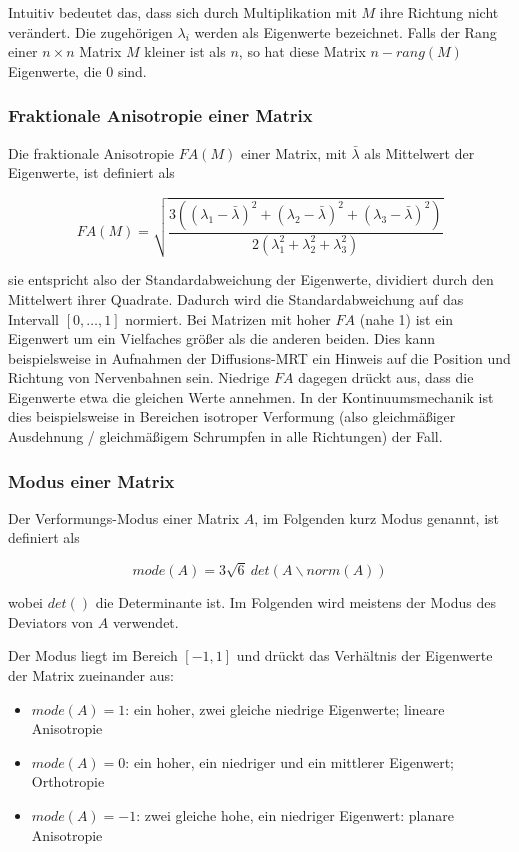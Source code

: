 \documentclass[a4paper,fontsize=12pt,toc=bib,halfparskip]{scrartcl}
\begin{document}
Intuitiv bedeutet das, dass sich durch Multiplikation mit $M$ ihre Richtung nicht ver\"andert. Die zugeh\"origen $\lambda_i$ werden als Eigenwerte bezeichnet.
Falls der Rang einer $n\times n$ Matrix $M$ kleiner ist als $n$, so hat diese Matrix $n - rang(M)$ Eigenwerte, die 0 sind.

\subsubsection{Fraktionale Anisotropie einer Matrix}
Die fraktionale Anisotropie $FA(M)$ einer Matrix, mit $\bar{\lambda}$ als Mittelwert der Eigenwerte, ist definiert als

\begin{equation}
	FA(M) = \sqrt{\frac{3((\lambda_1 - \bar{\lambda})^2 + (\lambda_2 - \bar{\lambda})^2 + (\lambda_3 - \bar{\lambda})^2)}{2(\lambda_1^2 + \lambda_2^2 + \lambda_3^2)}}
\end{equation}

sie entspricht also der Standardabweichung der Eigenwerte, dividiert durch den Mittelwert ihrer Quadrate. Dadurch wird die Standardabweichung auf das Intervall $[0,\dots,1]$ normiert. Bei Matrizen mit hoher $FA$ (nahe 1) ist ein Eigenwert um ein Vielfaches gr\"o{\ss}er als die anderen beiden. Dies kann beispielsweise in Aufnahmen der Diffusions-MRT ein Hinweis auf die Position und Richtung von Nervenbahnen sein. Niedrige $FA$ dagegen dr\"uckt aus, dass die Eigenwerte etwa die gleichen Werte annehmen. In der Kontinuumsmechanik ist dies beispielsweise in Bereichen isotroper Verformung (also gleichm\"a{\ss}iger Ausdehnung / gleichm\"a{\ss}igem Schrumpfen in alle Richtungen) der Fall.

\subsubsection{Modus einer Matrix}
Der Verformungs-Modus \cite{criscione2000invariant} einer Matrix $A$, im Folgenden kurz Modus genannt, ist definiert als

\begin{equation}
	mode(A) = 3\sqrt{6}~det(A\backslash norm(A))
\end{equation}

wobei $det()$ die Determinante ist. Im Folgenden wird meistens der Modus des Deviators von $A$ verwendet.

Der Modus liegt im Bereich $[-1,1]$ und dr\"uckt das Verh\"altnis der Eigenwerte der Matrix zueinander aus:

\begin{itemize}
	\item $mode(A) = 1$: ein hoher, zwei gleiche niedrige Eigenwerte; lineare Anisotropie
	\item $mode(A) = 0$: ein hoher, ein niedriger und ein mittlerer Eigenwert; Orthotropie
	\item $mode(A) = -1$: zwei gleiche hohe, ein niedriger Eigenwert: planare Anisotropie
\end{itemize} 
\end{document}
